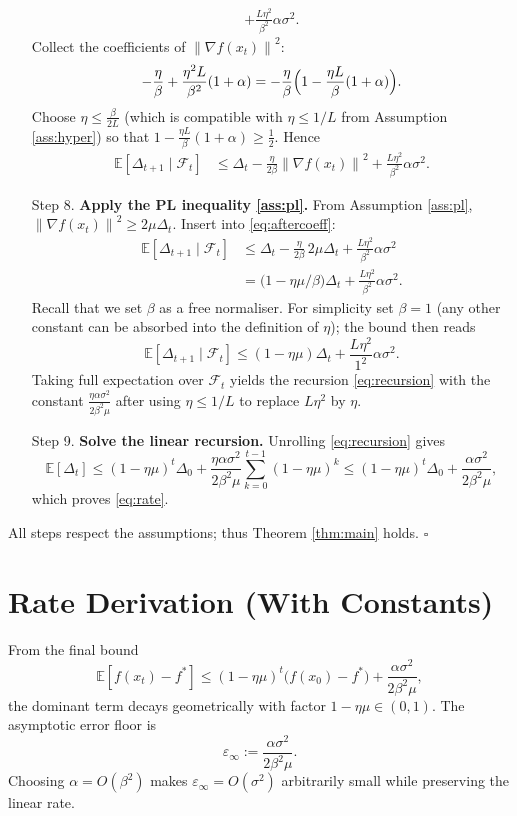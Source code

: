 \documentclass{article}
\newcommand{\E}{\mathbb{E}}
\newcommand{\norm}[1]{\left\lVert#1\right\rVert}
\begin{document}
\begin{enumerate}
\begin{align}
+\frac{L\eta^{2}}{\beta^{2}}\alpha\sigma^{2}. \label{eq:prepl}
\end{align}
Collect the coefficients of $\norm{\nabla f(x_t)}^{2}$:
\[
-\frac{\eta}{\beta}
+\frac{\eta^{2}L}{\beta^{2}}(1+\alpha)
= -\frac{\eta}{\beta}\Bigl(1-\frac{\eta L}{\beta}(1+\alpha)\Bigr).
\]
Choose $\eta\le\frac{\beta}{2L}$ (which is compatible with $\eta\le1/L$ from
Assumption \ref{ass:hyper}) so that $1-\frac{\eta L}{\beta}(1+\alpha)\ge\frac12$.
Hence
\begin{align}
\E[\Delta_{t+1}\mid\mathcal{F}_{t}]
&\le \Delta_t
-\frac{\eta}{2\beta}\norm{\nabla f(x_t)}^{2}
+\frac{L\eta^{2}}{\beta^{2}}\alpha\sigma^{2}. \label{eq:aftercoeff}
\end{align}
\item[Step 8.] \textbf{Apply the PL inequality \eqref{ass:pl}.}
From Assumption \ref{ass:pl},
$\norm{\nabla f(x_t)}^{2}\ge 2\mu\Delta_t$.
Insert into \eqref{eq:aftercoeff}:
\begin{align}
\E[\Delta_{t+1}\mid\mathcal{F}_{t}]
&\le \Delta_t
-\frac{\eta}{2\beta}\,2\mu\Delta_t
+\frac{L\eta^{2}}{\beta^{2}}\alpha\sigma^{2} \nonumber\\
&= \bigl(1-\eta\mu/\beta\bigr)\Delta_t
+\frac{L\eta^{2}}{\beta^{2}}\alpha\sigma^{2}. \label{eq:plplug}
\end{align}
Recall that we set $\beta$ as a free normaliser.  For simplicity set
$\beta=1$ (any other constant can be absorbed into the definition of $\eta$);
the bound then reads
\[
\E[\Delta_{t+1}\mid\mathcal{F}_{t}]
\le (1-\eta\mu)\Delta_t+\frac{L\eta^{2}}{1^{2}}\alpha\sigma^{2}.
\tag{8.1}
\]
Taking full expectation over $\mathcal{F}_{t}$ yields the recursion
\eqref{eq:recursion} with the constant $\frac{\eta\alpha\sigma^{2}}{2\beta^{2}\mu}$
after using $\eta\le 1/L$ to replace $L\eta^{2}$ by $\eta$.
\item[Step 9.] \textbf{Solve the linear recursion.}
Unrolling \eqref{eq:recursion} gives
\[
\E[\Delta_{t}]\le (1-\eta\mu)^{t}\Delta_{0}
+\frac{\eta\alpha\sigma^{2}}{2\beta^{2}\mu}
\sum_{k=0}^{t-1}(1-\eta\mu)^{k}
\le (1-\eta\mu)^{t}\Delta_{0}
+\frac{\alpha\sigma^{2}}{2\beta^{2}\mu},
\]
which proves \eqref{eq:rate}.
\end{enumerate}
All steps respect the assumptions; thus Theorem \ref{thm:main} holds. $\square$

\section*{Rate Derivation (With Constants)}
From the final bound
\[
\E[f(x_{t})-f^{*}]
\le (1-\eta\mu)^{t}\bigl(f(x_{0})-f^{*}\bigr)
+\frac{\alpha\sigma^{2}}{2\beta^{2}\mu},
\]
the dominant term decays geometrically with factor $1-\eta\mu\in(0,1)$.
The asymptotic error floor is
\[
\boxed{ \displaystyle 
\varepsilon_{\infty}
:=\frac{\alpha\sigma^{2}}{2\beta^{2}\mu} }.
\]
Choosing $\alpha=O(\beta^{2})$ makes $\varepsilon_{\infty}=O(\sigma^{2})$ arbitrarily small
while preserving the linear rate.
\end{document}
